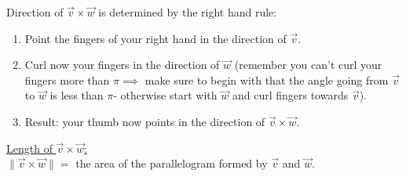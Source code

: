 \documentclass{report}
\begin{document}
   Direction of $ \vec{ v}  \times  \vec{ w} $ is determined by the right hand rule:
   \begin{enumerate}[label=(\arabic*).]  
     \item Point the fingers of your right hand in the direction of $ \vec{ v} $.
     \item Curl now your fingers in the direction of $ \vec{ w} $ (remember you can't curl your fingers more than $ \pi \implies$ make sure to begin with that the angle going from $ \vec{ v} $ to $ \vec{ w} $ is less than $ \pi$- otherwise start with $ \vec{ w} $ and curl fingers towards $ \vec{ v} $).
     \item Result: your thumb now points in the direction of $ \vec{ v} \times  \vec{ w} $.
   \end{enumerate}
   \underline{Length of $ \vec{ v} \times  \vec{ w} $:}\\
   \thm{}
   {
   $ \|\vec{ v} \times  \vec{ w} \|= $ the area of the parallelogram formed by $ \vec{ v} $ and $ \vec{ w} $.\\
   }
\end{document}
